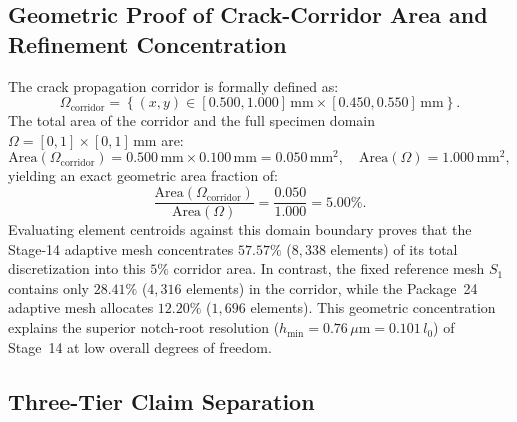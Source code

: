 \subsection{Geometric Proof of Crack-Corridor Area and Refinement Concentration}
\label{subsec:stage14uu_geometry_proof}

The crack propagation corridor is formally defined as:
\begin{equation}
\Omega_{\mathrm{corridor}} = \left\{ (x, y) \in [0.500, 1.000]\,\mathrm{mm} \times [0.450, 0.550]\,\mathrm{mm} \right\}.
\end{equation}
The total area of the corridor and the full specimen domain $\Omega = [0, 1] \times [0, 1]\,\mathrm{mm}$ are:
\begin{equation}
\mathrm{Area}(\Omega_{\mathrm{corridor}}) = 0.500\,\mathrm{mm} \times 0.100\,\mathrm{mm} = 0.050\,\mathrm{mm}^2, \quad \mathrm{Area}(\Omega) = 1.000\,\mathrm{mm}^2,
\end{equation}
yielding an exact geometric area fraction of:
\begin{equation}
\frac{\mathrm{Area}(\Omega_{\mathrm{corridor}})}{\mathrm{Area}(\Omega)} = \frac{0.050}{1.000} = 5.00\%.
\end{equation}
Evaluating element centroids against this domain boundary proves that the Stage-14 adaptive mesh concentrates $\mathbf{57.57\%}$ ($8{,}338$ elements) of its total discretization into this $5\%$ corridor area. In contrast, the fixed reference mesh $S_1$ contains only $28.41\%$ ($4{,}316$ elements) in the corridor, while the Package~24 adaptive mesh allocates $12.20\%$ ($1{,}696$ elements). This geometric concentration explains the superior notch-root resolution ($h_{\min} = 0.76\,\mu\mathrm{m} = 0.101\,l_0$) of Stage~14 at low overall degrees of freedom.

\subsection{Three-Tier Claim Separation}
\label{subsec:stage14uu_three_tier_claims}

